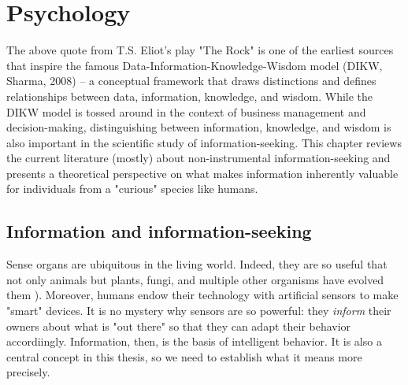 \chapter{Psychology}\label{ch:psychology}

\begin{flushright}{\slshape
    Where is the wisdom we have lost in knowledge? \\
    Where is the knowledge we have lost in information? 
    ---  \citep{knuth:1974}
\end{flushright}

The above quote from T.S. Eliot's play "The Rock" is one of the earliest sources that inspire the famous Data-Information-Knowledge-Wisdom model (DIKW, Sharma, 2008) -- a conceptual framework that draws distinctions and defines relationships between data, information, knowledge, and wisdom. While the DIKW model is tossed around in the context of business management and decision-making, distinguishing between information, knowledge, and wisdom is also important in the scientific study of information-seeking. This chapter reviews the current literature (mostly) about non-instrumental information-seeking and presents a theoretical perspective on what makes information inherently valuable for individuals from a "curious" species like humans.

\section{Information and information-seeking}

Sense organs are ubiquitous in the living world. Indeed, they are so useful that not only animals but plants, fungi, and multiple other organisms have evolved them \cite{trewavas_plant_2005,braunsdorf_fungal_2016,bourret_census_200,schwab_evolution_2018}). Moreover, humans endow their technology with artificial sensors to make "smart" devices. %
It is no mystery why sensors are so powerful: they \emph{inform} their owners about what is "out there" so that they can adapt their behavior accordiingly. Information, then, is the basis of intelligent behavior. It is also a central concept in this thesis, so we need to establish what it means more precisely. 

